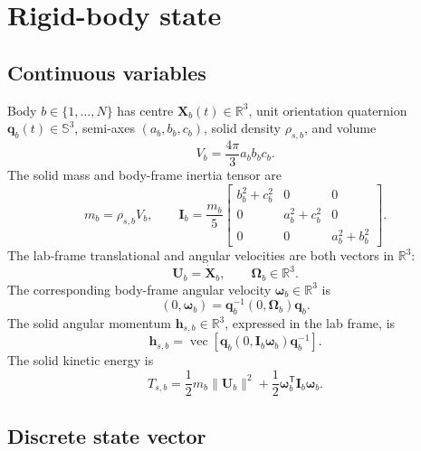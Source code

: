 \documentclass[11pt,a4paper]{article}
\newcommand{\R}{\mathbb{R}}
\newcommand{\bX}{\bm{X}}
\newcommand{\bU}{\bm{U}}
\newcommand{\bomega}{\bm{\omega}}
\newcommand{\bOmega}{\bm{\Omega}}
\newcommand{\bI}{\bm{I}}
\newcommand{\bh}{\bm{h}}
\newcommand{\quat}[1]{\mathbf{#1}}
\begin{document}
\section{Rigid-body state}

\subsection{Continuous variables}

Body $b\in\{1,\ldots,N\}$ has centre $\bX_b(t)\in\R^3$, unit orientation
quaternion $\quat{q}_b(t)\in\mathbb{S}^3$, semi-axes $(a_b,b_b,c_b)$, solid
density $\rho_{s,b}$, and volume
\begin{equation}
  V_b = \frac{4\pi}{3}a_b b_b c_b .
\end{equation}
The solid mass and body-frame inertia tensor are
\begin{equation}
  m_b = \rho_{s,b}V_b,\qquad
  \bI_b =
  \frac{m_b}{5}
  \begin{bmatrix}
    b_b^2+c_b^2 & 0 & 0\\
    0 & a_b^2+c_b^2 & 0\\
    0 & 0 & a_b^2+b_b^2
  \end{bmatrix}.
  \label{eq:mass-inertia}
\end{equation}
The lab-frame translational and angular velocities are both vectors in $\R^3$:
\begin{equation}
  \bU_b = \dot{\bX}_b,\qquad \bOmega_b \in \R^3 .
\end{equation}
The corresponding body-frame angular velocity $\bomega_b\in\R^3$ is
\begin{equation}
  (0,\bomega_b)
  =
  \quat{q}_b^{-1}(0,\bOmega_b)\quat{q}_b .
  \label{eq:body-omega}
\end{equation}
The solid angular momentum $\bh_{s,b}\in\R^3$, expressed in the lab frame, is
\begin{equation}
  \bh_{s,b}
  =
  \operatorname{vec}\!\left[
    \quat{q}_b(0,\bI_b\bomega_b)\quat{q}_b^{-1}
  \right].
  \label{eq:solid-angular-momentum}
\end{equation}
The solid kinetic energy is
\begin{equation}
  T_{s,b}
  =
  \frac{1}{2}m_b\|\bU_b\|^2
  +
  \frac{1}{2}\bomega_b^\mathsf{T}\bI_b\bomega_b .
  \label{eq:solid-ke}
\end{equation}

\subsection{Discrete state vector}
\end{document}
